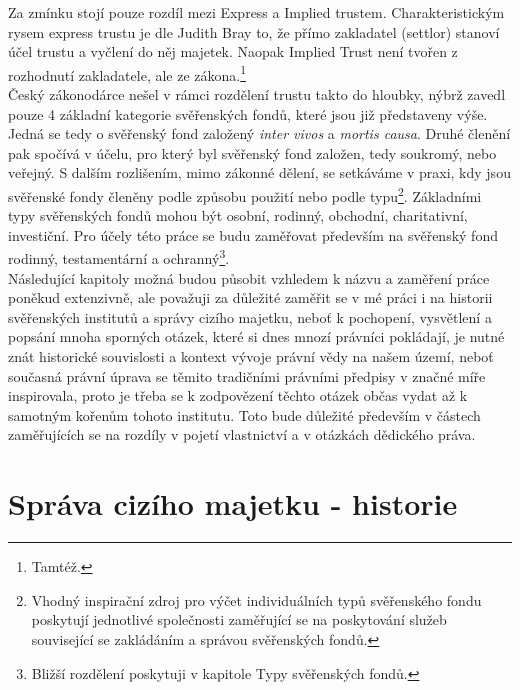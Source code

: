 \documentclass{article}
\begin{document}

Za zmínku stojí pouze rozdíl mezi Express a Implied trustem. Charakteristickým rysem express trustu je dle Judith Bray to, že přímo zakladatel (settlor) stanoví účel trustu a vyčlení do něj majetek. Naopak Implied Trust není tvořen z rozhodnutí zakladatele, ale ze zákona.\footnote{Tamtéž.}\\

Český zákonodárce nešel v rámci rozdělení trustu takto do hloubky, nýbrž zavedl pouze 4 základní kategorie svěřenských fondů, které jsou již představeny výše. Jedná se tedy o svěřenský fond založený \textit{inter vivos} a \textit{mortis causa}. Druhé členění pak spočívá v účelu, pro který byl svěřenský fond založen, tedy soukromý, nebo veřejný. S dalším rozlišením, mimo zákonné dělení, se setkáv\-áme v praxi, kdy jsou svěřenské fondy členěny podle způsobu použití nebo podle typu\footnote{Vhodný inspirační zdroj pro výčet individuálních typů svěřenského fondu poskytují jednotlivé společnosti zaměřující se na poskytování služeb související se zakládáním a správou svěřenských fondů.}. Základními typy svěřenských fondů mohou být osobní, rodinný, obchodní, charitativní, investiční. Pro účely této práce se budu zaměřovat především na svěřenský fond rodinný, testamentární a ochranný\footnote{Bližší rozdělení poskytuji v kapitole Typy svěřenských fondů.}.\\

Následující kapitoly možná budou působit vzhledem k názvu a zaměření práce poněkud extenzivně, ale považuji za důležité zaměřit se v mé práci i na historii svěřenských institutů a správy cizího majetku, neboť k pochopení, vysvětlení a popsání mnoha sporných otázek, které si dnes mnozí právníci pokládají, je nutné znát historické souvislosti a kontext vývoje právní vědy na našem území, neboť současná právní úprava se těmito tradičními právními předpisy v značné míře inspirovala, proto je třeba se k zodpovězení těchto otázek občas vydat až k samotným kořenům tohoto institutu. Toto bude důležité především v částech zaměřujících se na rozdíly v pojetí vlastnictví a v otázkách dědického práva.\\


\newpage

\section{Správa cizího majetku - historie}
\end{document}
